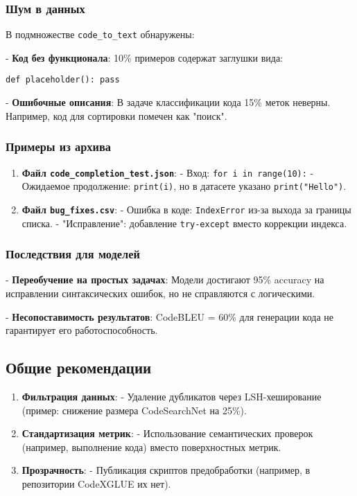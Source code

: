 \subsubsection{Шум в данных}

В подмножестве \texttt{code\_to\_text} обнаружены:

    
- \textbf{Код без функционала}: 10\% примеров содержат заглушки вида:
    \begin{verbatim}
def placeholder(): pass
    \end{verbatim}
    
- \textbf{Ошибочные описания}: В задаче классификации кода 15\% меток неверны. Например, код для сортировки помечен как "поиск".


\subsubsection{Примеры из архива}

\begin{enumerate}
    \item \textbf{Файл \texttt{code\_completion\_test.json}}:  
      - Вход: \texttt{for i in range(10):}  
      - Ожидаемое продолжение: \texttt{print(i)}, но в датасете указано \texttt{print("Hello")}.
    \item \textbf{Файл \texttt{bug\_fixes.csv}}:  
      - Ошибка в коде: \texttt{IndexError} из-за выхода за границы списка.  
      - "Исправление": добавление \texttt{try-except} вместо коррекции индекса.
\end{enumerate}

\subsubsection{Последствия для моделей}


    
- \textbf{Переобучение на простых задачах}: Модели достигают 95\% accuracy на исправлении синтаксических ошибок, но не справляются с логическими.
    
- \textbf{Несопоставимость результатов}: CodeBLEU = 60\% для генерации кода не гарантирует его работоспособность.


\subsection{Общие рекомендации}

\begin{enumerate}
    \item \textbf{Фильтрация данных}:  
      - Удаление дубликатов через LSH-хеширование (пример: снижение размера CodeSearchNet на 25\%).
    \item \textbf{Стандартизация метрик}:  
      - Использование семантических проверок (например, выполнение кода) вместо поверхностных метрик.
    \item \textbf{Прозрачность}:  
      - Публикация скриптов предобработки (например, в репозитории CodeXGLUE \cite{codexglue_repo} их нет).
\end{enumerate}

